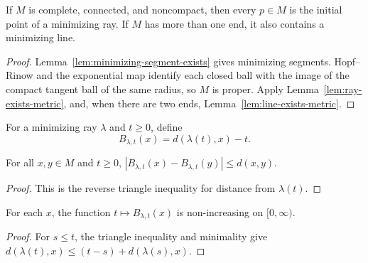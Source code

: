 \begin{lemma}
\label{lem:ends-exist}


\label{ends}




If $M$ is complete, connected, and noncompact, then every $p\in M$ is
the initial point of a minimizing ray. If $M$ has more than one end, it
also contains a minimizing line.
\end{lemma}
\begin{proof}
\sketch

Lemma~\ref{lem:minimizing-segment-exists} gives minimizing segments.
Hopf--Rinow and the exponential map identify each closed ball with the
image of the compact tangent ball of the same radius, so $M$ is proper.
Apply Lemma~\ref{lem:ray-exists-metric}, and, when there are two ends,
Lemma~\ref{lem:line-exists-metric}.
\end{proof}

\begin{definition}
\label{def:busemann-approx}






For a minimizing ray $\lambda$ and $t\ge0$, define
$$B_{\lambda,t}(x)=d(\lambda(t),x)-t.$$
\end{definition}

\begin{lemma}
\label{lem:busemann-approx-lipschitz}





For all $x,y\in M$ and $t\ge0$,
$|B_{\lambda,t}(x)-B_{\lambda,t}(y)|\le d(x,y)$.
\label{eqnBlip}
\end{lemma}
\begin{proof}
\sketch

This is the reverse triangle inequality for distance from $\lambda(t)$.
\end{proof}

\begin{lemma}
\label{lem:busemann-approx-antitone}





For each $x$, the function $t\mapsto B_{\lambda,t}(x)$ is non-increasing
on $[0,\infty)$.
\label{eqnBmono}
\end{lemma}
\begin{proof}
\sketch

For $s\le t$, the triangle inequality and minimality give
$d(\lambda(t),x)\le(t-s)+d(\lambda(s),x)$.
\end{proof}

